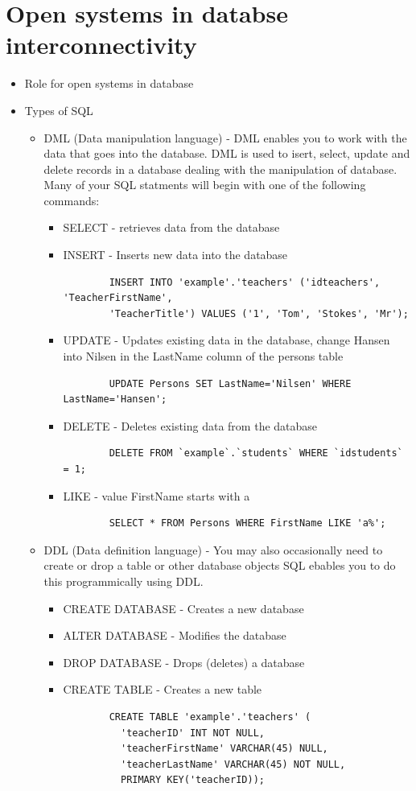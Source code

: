 \documentclass[12pt, a4, twoside]{article}
\begin{document}
\section{Open systems in databse interconnectivity}
\begin{itemize}
  \item Role for open systems in database 
  \item Types of SQL 
  \begin{itemize}
    \item DML (Data manipulation language) - DML enables you to work with the data that goes into the database. DML is used to isert, select, update and delete records in a database 
    dealing with the manipulation of database. Many of your SQL statments will begin with one of the following commands:
    \begin{itemize}
      \item SELECT - retrieves data from the database
      \item INSERT - Inserts new data into the database
      \begin{verbatim}
        INSERT INTO 'example'.'teachers' ('idteachers', 'TeacherFirstName',
        'TeacherTitle') VALUES ('1', 'Tom', 'Stokes', 'Mr');
      \end{verbatim}
      \item UPDATE - Updates existing data in the database, change Hansen into Nilsen in the LastName column of the persons table
      \begin{verbatim}
        UPDATE Persons SET LastName='Nilsen' WHERE LastName='Hansen';
      \end{verbatim}
      \item DELETE - Deletes existing data from the database
      \begin{verbatim}
        DELETE FROM `example`.`students` WHERE `idstudents` = 1;
      \end{verbatim}
      \item LIKE - value FirstName starts with a 
      \begin{verbatim}
        SELECT * FROM Persons WHERE FirstName LIKE 'a%';
      \end{verbatim}
    \end{itemize}
    \item DDL (Data definition language) - You may also occasionally need to create or drop a table or other database objects SQL ebables you to do this programmically using DDL. 
    \begin{itemize}
      \item CREATE DATABASE - Creates a new database 
      \item ALTER DATABASE - Modifies the database 
      \item DROP DATABASE - Drops (deletes) a database
      \item CREATE TABLE - Creates a new table 
      \begin{verbatim}
        CREATE TABLE 'example'.'teachers' (
          'teacherID' INT NOT NULL,
          'teacherFirstName' VARCHAR(45) NULL,
          'teacherLastName' VARCHAR(45) NOT NULL,
          PRIMARY KEY('teacherID));
      \end{verbatim}


\end{itemize}
\end{itemize}
\end{itemize}
\end{document}
